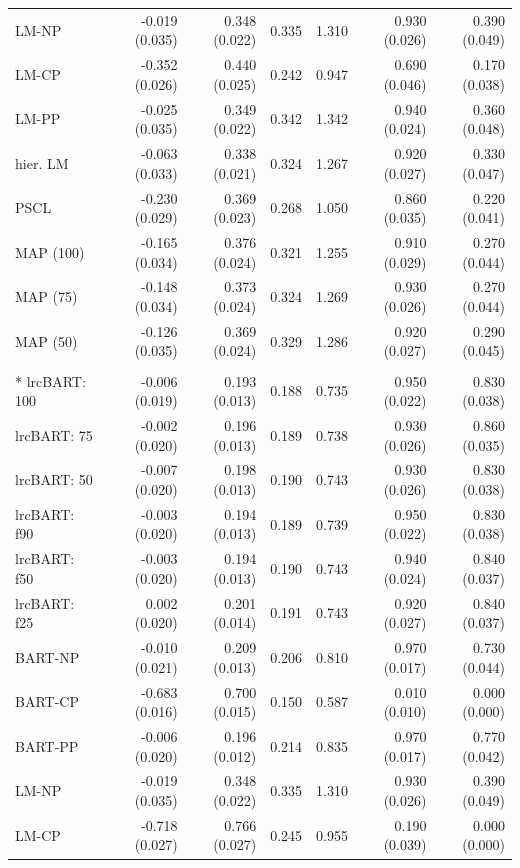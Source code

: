 \begin{landscape}
\begin{longtable}{lrrrrrr}
LM-NP & -0.019 (0.035) & 0.348 (0.022) & 0.335 & 1.310 & 0.930 (0.026) & 0.390 (0.049) \\
LM-CP & -0.352 (0.026) & 0.440 (0.025) & 0.242 & 0.947 & 0.690 (0.046) & 0.170 (0.038) \\
LM-PP & -0.025 (0.035) & 0.349 (0.022) & 0.342 & 1.342 & 0.940 (0.024) & 0.360 (0.048) \\
hier. LM & -0.063 (0.033) & 0.338 (0.021) & 0.324 & 1.267 & 0.920 (0.027) & 0.330 (0.047) \\
PSCL & -0.230 (0.029) & 0.369 (0.023) & 0.268 & 1.050 & 0.860 (0.035) & 0.220 (0.041) \\
MAP (100) & -0.165 (0.034) & 0.376 (0.024) & 0.321 & 1.255 & 0.910 (0.029) & 0.270 (0.044) \\
MAP (75) & -0.148 (0.034) & 0.373 (0.024) & 0.324 & 1.269 & 0.930 (0.026) & 0.270 (0.044) \\
MAP (50) & -0.126 (0.035) & 0.369 (0.024) & 0.329 & 1.286 & 0.920 (0.027) & 0.290 (0.045) \\
\newpage
\multicolumn{7}{l}{\strut\textit{Mean difference: Sc5, $X_7$, $\delta=2$}}\\*
lrcBART: 100 & -0.006 (0.019) & 0.193 (0.013) & 0.188 & 0.735 & 0.950 (0.022) & 0.830 (0.038) \\
lrcBART: 75 & -0.002 (0.020) & 0.196 (0.013) & 0.189 & 0.738 & 0.930 (0.026) & 0.860 (0.035) \\
lrcBART: 50 & -0.007 (0.020) & 0.198 (0.013) & 0.190 & 0.743 & 0.930 (0.026) & 0.830 (0.038) \\
lrcBART: f90 & -0.003 (0.020) & 0.194 (0.013) & 0.189 & 0.739 & 0.950 (0.022) & 0.830 (0.038) \\
lrcBART: f50 & -0.003 (0.020) & 0.194 (0.013) & 0.190 & 0.743 & 0.940 (0.024) & 0.840 (0.037) \\
lrcBART: f25 & 0.002 (0.020) & 0.201 (0.014) & 0.191 & 0.743 & 0.920 (0.027) & 0.840 (0.037) \\
BART-NP & -0.010 (0.021) & 0.209 (0.013) & 0.206 & 0.810 & 0.970 (0.017) & 0.730 (0.044) \\
BART-CP & -0.683 (0.016) & 0.700 (0.015) & 0.150 & 0.587 & 0.010 (0.010) & 0.000 (0.000) \\
BART-PP & -0.006 (0.020) & 0.196 (0.012) & 0.214 & 0.835 & 0.970 (0.017) & 0.770 (0.042) \\
LM-NP & -0.019 (0.035) & 0.348 (0.022) & 0.335 & 1.310 & 0.930 (0.026) & 0.390 (0.049) \\
LM-CP & -0.718 (0.027) & 0.766 (0.027) & 0.245 & 0.955 & 0.190 (0.039) & 0.000 (0.000) \\

\end{longtable}
\end{landscape}
